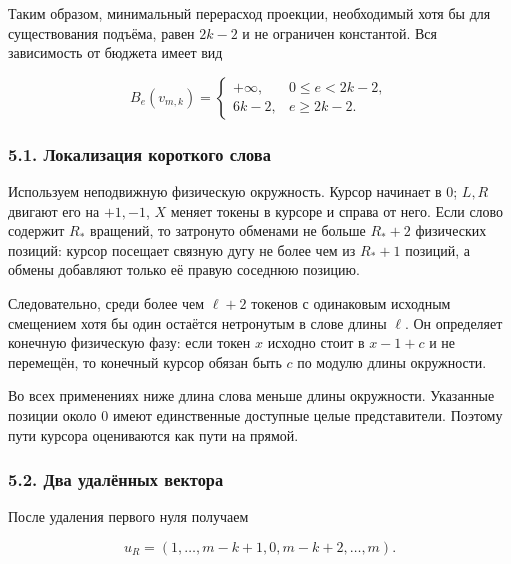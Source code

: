 \documentclass[
  11pt,
  a4paper,
]{article}
\begin{document}
Таким образом, минимальный перерасход проекции, необходимый хотя бы для
существования подъёма, равен \(2k-2\) и не ограничен константой. Вся
зависимость от бюджета имеет вид

\[B_e(v_{m,k})=
\begin{cases}
+\infty,&0\le e<2k-2,\\
6k-2,&e\ge2k-2.
\end{cases}\]

\hypertarget{ux43bux43eux43aux430ux43bux438ux437ux430ux446ux438ux44f-ux43aux43eux440ux43eux442ux43aux43eux433ux43e-ux441ux43bux43eux432ux430}{%
\subsubsection{5.1. Локализация короткого
слова}\label{ux43bux43eux43aux430ux43bux438ux437ux430ux446ux438ux44f-ux43aux43eux440ux43eux442ux43aux43eux433ux43e-ux441ux43bux43eux432ux430}}

Используем неподвижную физическую окружность. Курсор начинает в \(0\);
\(L,R\) двигают его на \(+1,-1\), \(X\) меняет токены в курсоре и справа
от него. Если слово содержит \(R_*\) вращений, то затронуто обменами не
больше \(R_*+2\) физических позиций: курсор посещает связную дугу не
более чем из \(R_*+1\) позиций, а обмены добавляют только её правую
соседнюю позицию.

Следовательно, среди более чем \(\ell+2\) токенов с одинаковым исходным
смещением хотя бы один остаётся нетронутым в слове длины \(\ell\). Он
определяет конечную физическую фазу: если токен \(x\) исходно стоит в
\(x-1+c\) и не перемещён, то конечный курсор обязан быть \(c\) по модулю
длины окружности.

Во всех применениях ниже длина слова меньше длины окружности. Указанные
позиции около \(0\) имеют единственные доступные целые представители.
Поэтому пути курсора оцениваются как пути на прямой.

\hypertarget{ux434ux432ux430-ux443ux434ux430ux43bux451ux43dux43dux44bux445-ux432ux435ux43aux442ux43eux440ux430}{%
\subsubsection{5.2. Два удалённых
вектора}\label{ux434ux432ux430-ux443ux434ux430ux43bux451ux43dux43dux44bux445-ux432ux435ux43aux442ux43eux440ux430}}

После удаления первого нуля получаем

\[u_R=(1,\ldots,m-k+1,0,m-k+2,\ldots,m).\]
\end{document}
